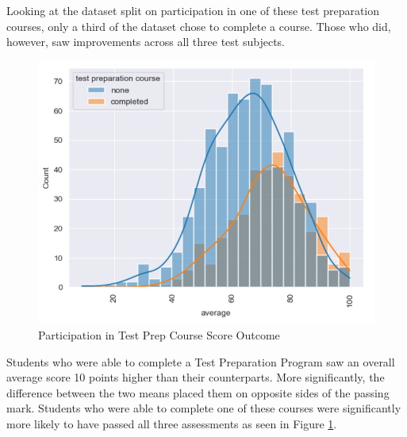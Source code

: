 \documentclass[man,floatsintext]{apa6} %
\begin{document}
Looking at the dataset split on participation in one of these test preparation courses, only a third of the dataset chose to complete a course. Those who did, however, saw improvements across all three test subjects.
\begin{figure}[H]
    \centering
    \includegraphics[width=0.7\linewidth]{TestPrepOverall.png}
    \caption{Participation in Test Prep Course Score Outcome}
    \label{fig:TestPrepOverall}
\end{figure}
Students who were able to complete a Test Preparation Program saw an overall average score 10 points higher than their counterparts. More significantly, the difference between the two means placed them on opposite sides of the passing mark. Students who were able to complete one of these courses were significantly more likely to have passed all three assessments as seen in Figure \ref{fig:TestPrepOverall}.
\end{document}
